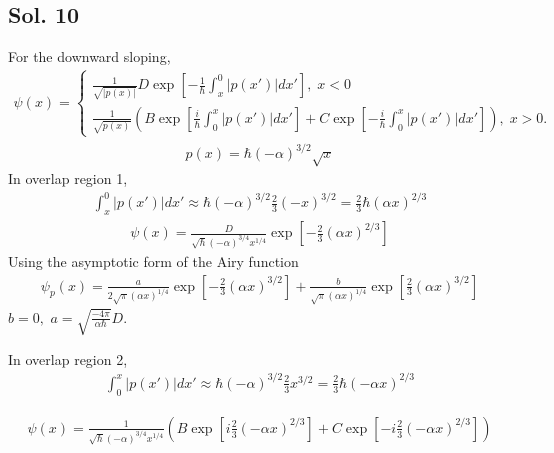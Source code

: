 \subsection*{Sol. 10}
For the downward sloping,
\begin{align*}
    \psi(x)=
    \begin{cases}
    \frac{1}{\sqrt{|p(x)|}}D\exp\left[
    -\frac{1}{\hbar}\int_x^0|p(x')|dx'
    \right],\; x<0\\
    \frac{1}{\sqrt{p(x)}}
    \left(B\exp\left[
    \frac{i}{\hbar}\int_0^x|p(x')|dx'
    \right]
    +
    C\exp\left[
    -\frac{i}{\hbar}\int_0^x|p(x')|dx'
    \right]
    \right),\; x>0.
    \end{cases}
\end{align*}
\begin{align*}
    p(x)=\hbar(-\alpha)^{3/2}\sqrt{x}
\end{align*}
In overlap region 1,
\begin{align*}
    \int_x^0|p(x')|dx'\approx 
    \hbar(-\alpha)^{3/2}\frac{2}{3}(-x)^{3/2}
    =\frac{2}{3}\hbar(\alpha x)^{2/3}
\end{align*}
\begin{align*}
    \psi(x)=\frac{D}{\sqrt{\hbar}(-\alpha)^{3/4}x^{1/4}}
    \exp\left[-
    \frac{2}{3}(\alpha x)^{2/3}
    \right]
\end{align*}
Using the asymptotic form of the Airy function
\begin{align*}
    \psi_p(x)=\frac{a}{2\sqrt{\pi}(\alpha x)^{1/4}}
    \exp\left[-\frac{2}{3}(\alpha x)^{3/2}\right]
    +
    \frac{b}{\sqrt{\pi}(\alpha x)^{1/4}}
    \exp\left[\frac{2}{3}(\alpha x)^{3/2}\right]
\end{align*}
$b=0,$
$a=\sqrt{\frac{-4\pi}{\alpha \hbar}}D.$

In overlap region 2,
\begin{align*}
    \int_0^x|p(x')|dx'\approx 
    \hbar(-\alpha)^{3/2}\frac{2}{3}x^{3/2}
    =\frac{2}{3}\hbar(-\alpha x)^{2/3}
\end{align*}

\begin{align*}
    \psi(x)=\frac{1}{\sqrt{\hbar}(-\alpha)^{3/4}x^{1/4}}
    \left(B\exp\left[
    i\frac{2}{3}(-\alpha x)^{2/3}
    \right]
    +
    C\exp\left[
    -i\frac{2}{3}(-\alpha x)^{2/3}
    \right]
    \right)
\end{align*}

